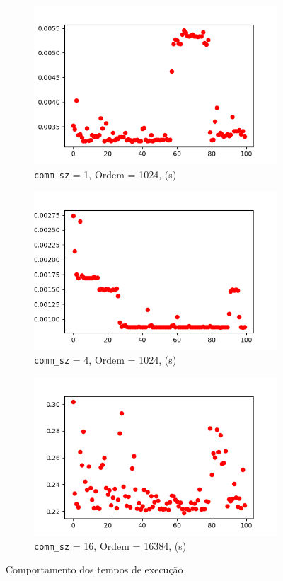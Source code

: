 \begin{figure}[h!]
\centering
\begin{subfigure}{.5\textwidth}
  \centering
  \includegraphics[width=.9\linewidth]{sections/q3.21/imgs/fig1-1024.png}
  \caption{\texttt{comm\_sz} = 1, Ordem = 1024, (s)}
  \label{fig:sub1}
\end{subfigure}%
\begin{subfigure}{.5\textwidth}
  \centering
  \includegraphics[width=.9\linewidth]{sections/q3.21/imgs/fig4-1024.png}
  \caption{\texttt{comm\_sz} = 4, Ordem = 1024, (s)}
  \label{fig:sub2}
\end{subfigure}
\begin{subfigure}{.5\textwidth}
  \centering
  \includegraphics[width=.9\linewidth]{sections/q3.21/imgs/fig16-16384.png}
  \caption{\texttt{comm\_sz} = 16, Ordem = 16384, (s)}
  \label{fig:sub3}
\end{subfigure}
\caption{Comportamento dos tempos de execução}
\label{fig:comp}
\end{figure}



